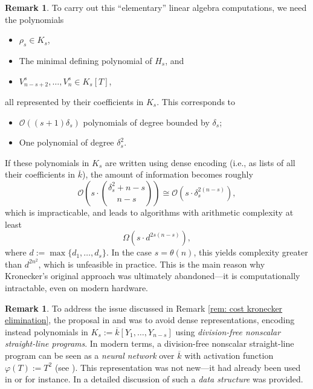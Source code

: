 \documentclass[pdflatex,sn-basic]{sn-jnl}%
\theoremstyle{thmstyleone}%
\theoremstyle{thmstyletwo}%
\theoremstyle{thmstylethree}%
\theoremstyle{definition}
\newtheorem{remark}[theorem]{Remark}
\numberwithin{equation}{section}
\begin{document}
\begin{remark}\label{rem: cost kronecker elimination}
To carry out this ``elementary'' linear algebra computations, we
need the polynomials
%
\begin{itemize}
  \item $\rho_s\in K_s$,
  \item The minimal defining polynomial of $H_s$, and
  \item $V_{n-s+2}^s,\ldots,V_n^s\in K_s[T]$,
\end{itemize}
all represented by their coefficients in $K_s$. This corresponds to
%
\begin{itemize}
  \item $\mathcal{O}((s+1)\delta_s)$ polynomials of degree bounded by
  $\delta_s$;
  \item One polynomial of degree $\delta_s^2$.
\end{itemize}
%
If these polynomials in $K_s$ are written using dense encoding (i.e.,
as lists of all their coefficients in $\overline{k}$), the amount of
information becomes roughly
%
$$\mathcal{O}\left(s\cdot \binom{\delta_s^2+n-s}{n-s}\right)\cong
\mathcal{O}\left(s\cdot \delta_s^{2(n-s)}\right),$$
%
which is impracticable, and leads to algorithms with arithmetic
complexity at least
%
$$\Omega(s\cdot d^{2s(n-s)}),$$
%
where $d:=\max\{d_1,\ldots,d_s\}$. In the case $s=\theta(n)$, this yields
complexity greater than $d^{2n^2}$, which is unfeasible in practice.
This is the main reason why Kronecker's original approach was
ultimately abandoned---it is computationally intractable, even on
modern hardware.
\end{remark}

\begin{remark}
To address the issue discussed in Remark \ref{rem: cost kronecker
elimination}, the proposal in \cite{GiHeMoPa95} and \cite{Pardo95}
was to avoid dense representations, encoding instead polynomials in
$K_s:=\overline{k}[Y_1,\ldots,Y_{n-s}]$ using {\em division-free nonscalar straight-line
programs}. In modern terms, a division-free nonscalar straight-line program can be seen as a
{\em neural network} over $\overline{k}$ with activation function
$\varphi(T):=T^2$ (see \cite{PaSe26}). This representation was not new---it had already
been used in \cite{FiGiSm95} or \cite{KrPa96} for instance. In
\cite{KrPa96} a detailed discussion of such a {\em data structure} was
provided.
\end{remark}
\end{document}
